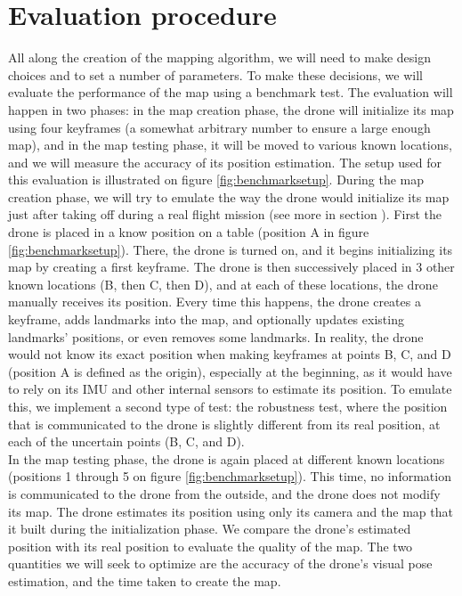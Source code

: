 \section{Evaluation procedure} \label{evalproc}
All along the creation of the mapping algorithm, we will need to make design choices and to set a number of parameters. To make these decisions, we will evaluate the performance of the map using a benchmark test.
The evaluation will happen in two phases: in the map creation phase, the drone will initialize its map using four keyframes (a somewhat arbitrary number to ensure a large enough map), and in the map testing phase, it will be moved to various known locations, and we will measure the accuracy of its position estimation. The setup used for this evaluation is illustrated on figure \ref{fig:benchmarksetup}. During the map creation phase, we will try to emulate the way the drone would initialize its map just after taking off during a real flight mission (see more in section %
). First the drone is placed in a know position on a table (position A in figure \ref{fig:benchmarksetup}). There, the drone is turned on, and it begins initializing its map by creating a first keyframe. The drone is then successively placed in 3 other known locations (B, then C, then D), and at each of these locations, the drone manually receives its position. Every time this happens, the drone creates a keyframe, adds landmarks into the map, and optionally updates existing landmarks' positions, or even removes some landmarks. In reality, the drone would not know its exact position when making keyframes at points B, C, and D (position A is defined as the origin), especially at the beginning, as it would have to rely on its IMU and other internal sensors to estimate its position. To emulate this, we implement a second type of test: the robustness test, where the position that is communicated to the drone is slightly different from its real position, at each of the uncertain points (B, C, and D).\\
In the map testing phase, the drone is again placed at different known locations (positions 1 through 5 on figure \ref{fig:benchmarksetup}). This time, no information is communicated to the drone from the outside, and the drone does not modify its map. The drone estimates its position using only its camera and the map that it built during the initialization phase. We compare the drone's estimated position with its real position to evaluate the quality of the map. The two quantities we will seek to optimize are the accuracy of the drone's visual pose estimation, and the time taken to create the map.


